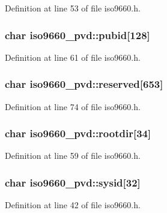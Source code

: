 Definition at line 53 of file iso9660.\+h.

\hypertarget{structiso9660__pvd_a2deec8116091f80a2e2c93035db3225f}{
\subsubsection[{pubid}]{\setlength{\rightskip}{0pt plus 5cm}char iso9660\+\_\+pvd\+::pubid\mbox{[}128\mbox{]}}}\label{structiso9660__pvd_a2deec8116091f80a2e2c93035db3225f}


Definition at line 61 of file iso9660.\+h.

\hypertarget{structiso9660__pvd_a9bb088c4b2405eea90e203d31478a03a}{
\subsubsection[{reserved}]{\setlength{\rightskip}{0pt plus 5cm}char iso9660\+\_\+pvd\+::reserved\mbox{[}653\mbox{]}}}\label{structiso9660__pvd_a9bb088c4b2405eea90e203d31478a03a}


Definition at line 74 of file iso9660.\+h.

\hypertarget{structiso9660__pvd_a4c7b731634349ebdefb9de29b1022af7}{
\subsubsection[{rootdir}]{\setlength{\rightskip}{0pt plus 5cm}char iso9660\+\_\+pvd\+::rootdir\mbox{[}34\mbox{]}}}\label{structiso9660__pvd_a4c7b731634349ebdefb9de29b1022af7}


Definition at line 59 of file iso9660.\+h.

\hypertarget{structiso9660__pvd_a51ac299b0235e32b6a2cfe79694af834}{
\subsubsection[{sysid}]{\setlength{\rightskip}{0pt plus 5cm}char iso9660\+\_\+pvd\+::sysid\mbox{[}32\mbox{]}}}\label{structiso9660__pvd_a51ac299b0235e32b6a2cfe79694af834}


Definition at line 42 of file iso9660.\+h.

